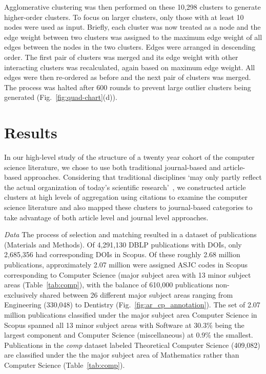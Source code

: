 Agglomerative clustering was then performed on these 10,298 clusters to generate higher-order clusters. To focus on larger clusters, only those with at least 10 nodes were used as input. Briefly, each cluster was now treated as a node and the edge weight between two clusters was assigned to the maximum edge weight of all edges between the nodes in the two clusters. Edges were arranged in descending order. The first pair of clusters was merged and its edge weight with other interacting clusters was recalculated, again based on maximum edge weight. All edges were then re-ordered as before and the next pair of clusters was merged. The process was halted after 600 rounds to prevent large outlier clusters being generated (Fig.~\ref{fig:quad-chart}(d)).

\section*{Results}
\label{sec:results}

 In our high-level study of the structure of a twenty year cohort of the computer science literature, we chose to use both traditional journal-based and article-based approaches. Considering that traditional disciplines `may only partly reflect the actual organization of today's scientific research'~\cite{waltman_new_2012}, we constructed article clusters at high levels of aggregation using citations to examine the  computer science literature and also mapped these clusters to journal-based categories to take advantage of both article level and journal level approaches.

\emph{Data} The process of selection and matching resulted in a dataset of  publications (Materials and Methods). Of 4,291,130 DBLP publications with DOIs, only  2,685,356 had corresponding DOIs in Scopus. Of these roughly 2.68 million publications, approximately 2.07 million were assigned ASJC codes in Scopus corresponding to Computer Science (major subject area with 13 minor subject areas (Table~\ref{tab:comp}), with the balance of 610,000 publications non-exclusively shared between 26 different major subject areas ranging from Engineering (330,048) to Dentistry (Fig.~\ref{fig:ar_cp_annotation}). The set of 2.07 million publications classified under the major subject area Computer Science in Scopus spanned all 13 minor subject areas with Software at 30.3\%  being the largest component and Computer Science (miscellaneous) at 0.9\% the smallest. Publications in the \emph{comp} dataset labeled Theoretical Computer Science (409,082) are classified under the the major subject area of Mathematics rather than Computer Science (Table~\ref{tab:comp}). 

